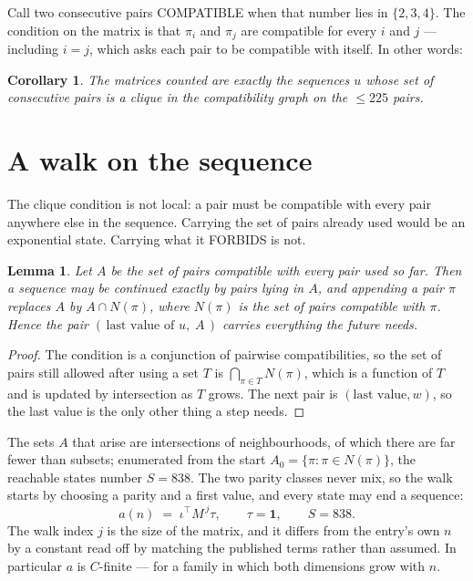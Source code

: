 \documentclass[11pt,a4paper]{article}
\theoremstyle{plain}
\newtheorem{lemma}[theorem]{Lemma}
\newtheorem{corollary}[theorem]{Corollary}
\theoremstyle{definition}
\begin{document}
Call two consecutive pairs COMPATIBLE when that number lies in $\{2,3,4\}$. The condition on the
matrix is that $\pi_i$ and $\pi_j$ are compatible for every $i$ and $j$ --- including $i=j$,
which asks each pair to be compatible with itself. In other words:

\begin{corollary}
The matrices counted are exactly the sequences $u$ whose set of consecutive pairs is a clique in
the compatibility graph on the $\le 225$ pairs.
\end{corollary}

\section{A walk on the sequence}

The clique condition is not local: a pair must be compatible with every pair anywhere else in
the sequence. Carrying the set of pairs already used would be an exponential state. Carrying
what it FORBIDS is not.

\begin{lemma}\label{lem:lump}
Let $A$ be the set of pairs compatible with every pair used so far. Then a sequence may be
continued exactly by pairs lying in $A$, and appending a pair $\pi$ replaces $A$ by
$A\cap N(\pi)$, where $N(\pi)$ is the set of pairs compatible with $\pi$. Hence the pair
$(\,\text{last value of }u,\;A\,)$ carries everything the future needs.
\end{lemma}

\begin{proof}
The condition is a conjunction of pairwise compatibilities, so the set of pairs still allowed
after using a set $T$ is $\bigcap_{\pi\in T}N(\pi)$, which is a function of $T$ and is updated
by intersection as $T$ grows. The next pair is $(\text{last value},w)$, so the last value is
the only other thing a step needs.
\end{proof}

The sets $A$ that arise are intersections of neighbourhoods, of which there are far fewer than
subsets; enumerated from the start $A_0=\{\pi:\pi\in N(\pi)\}$, the reachable states number
$S=838$. The two parity classes never mix, so the walk starts by choosing a parity and a first
value, and every state may end a sequence:
\[
a(n)\;=\;\iota^{\!\top}M^{\,j}\tau ,\qquad \tau=\mathbf{1},\qquad S=838.
\]
The walk index $j$ is the size of the matrix, and it differs from the entry's own $n$ by a
constant read off by matching the published terms rather than assumed. In particular $a$ is
$C$-finite --- for a family in which both dimensions grow with $n$.
\end{document}
